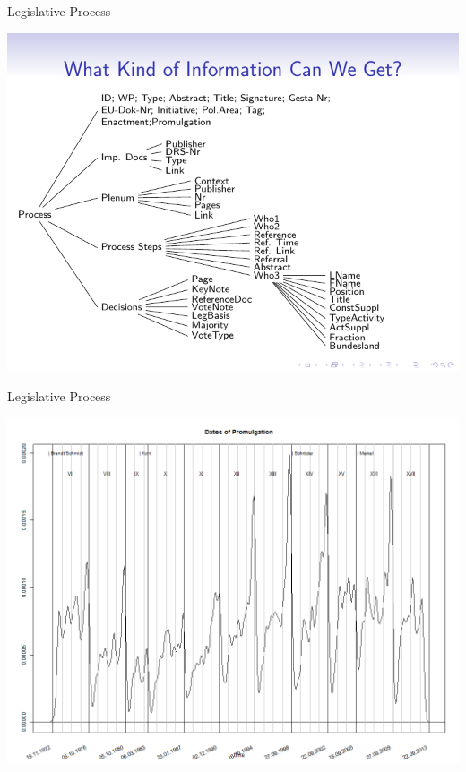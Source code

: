 \documentclass[ignorenonframetext,]{beamer}
\begin{document}
\begin{frame}{Legislative Process}

\includegraphics{fig/legislation0.pdf}

\end{frame}

\begin{frame}{Legislative Process}

\includegraphics{fig/legislation.png}

\end{frame}
\end{document}
